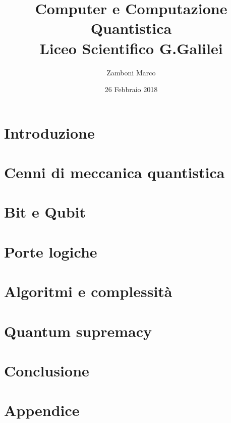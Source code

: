 \documentclass[10pt]{report}
\author{Zamboni Marco}
\date{26 Febbraio 2018}
\title{{Computer e Computazione Quantistica}\\
		{\large Liceo Scientifico G.Galilei}}
\begin{document}

\tableofcontents
\chapter{Introduzione}

\chapter{Cenni di meccanica quantistica}

\chapter{Bit e Qubit}

\chapter{Porte logiche}

\chapter{Algoritmi e complessità}

\chapter{Quantum supremacy}

\chapter{Conclusione}

\appendix
\chapter{Appendice}

\end{document}
